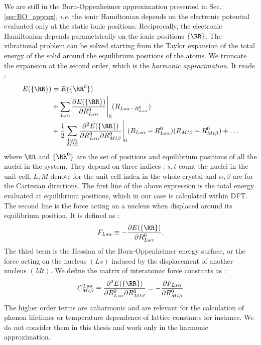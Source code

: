 We are still in the Born-Oppenheimer approximation presented in Sec. \ref{sec:BO_approx}, \textit{i.e.} the ionic Hamiltonian depends on the electronic potential evaluated only at the static ionic positions. Reciprocally, the electronic Hamiltonian depends parametrically on the ionic positions $\{\RR\}$.
The vibrational problem can be solved starting from the Taylor expansion of the total energy of the solid around the equilibrium positions of the atoms. We truncate the expansion at the second order, which is the \textit{harmonic approximation}. It reads :
\begin{align}
\begin{split}
	E(\{\RR\}) &=  E(\{\RR^0\}) \\ 
	&+ \sum_{Ls\alpha} \frac{\partial E(\{\RR\})}{\partial R^0_{Ls\alpha}}\Biggr|_{0} (R_{Ls\alpha - R^0_{Ls\alpha}}) \\
	&+ \frac{1}{2} \sum_{\substack{Ls\alpha \\ Mt\beta}} \frac{\partial^2 E(\{\RR\})}{\partial R^0_{Ls\alpha} \partial R^0_{Mt\beta}}\Biggr|_{0} (R_{Ls\alpha} - R^0_{Ls\alpha}) (R_{Mt\beta} - R^0_{Mt\beta}) + \ldots
\end{split}
\end{align}
where ${\RR}$ and $\{\RR^0\}$ are the set of positions and equilibrium positions of all the nuclei in the system. They depend on three indices : $s,t$ count the nuclei in the unit cell, $L,M$ denote for the unit cell index in the whole crystal and $\alpha,\beta$ are for the Cartesian directions. The first line of the above expression is the total energy evaluated at equilibrium positions, which in our case is calculated within \acrshort{DFT}. The second line is the force acting on a nucleus when displaced around its equilibrium position. It is defined as :
\begin{equation}
	F_{Ls\alpha} \equiv -\frac{\partial E(\{ \RR\})}{\partial R^0_{Ls\alpha}}.
\end{equation}
The third term is the Hessian of the Born-Oppenheimer energy surface, or the force acting on the nucleus $(Ls)$ induced by the displacement of another nucleus $(Mt)$. We define the matrix of interatomic force constants as :
\begin{equation}
	C^{Ls\alpha}_{Mt\beta} \equiv \frac{\partial^2 E(\{\RR\})}{\partial R^0_{Ls\alpha} \partial R^0_{Mt\beta}} = -\frac{\partial F_{Ls\alpha}}{\partial R^0_{Mt\beta}}
	\label{eq:IFC_matrix}
\end{equation}
The higher order terms are anharmonic and are relevant for the calculation of phonon lifetimes or temperature dependence of lattice constants for instance. We do not consider them in this thesis and work only in the harmonic approximation.

